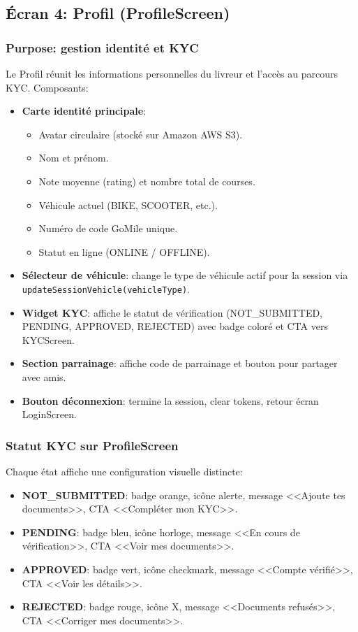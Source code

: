 \subsection{Écran 4: Profil (ProfileScreen)}

\subsubsection{Purpose: gestion identité et KYC}

Le Profil réunit les informations personnelles du livreur et l'accès au parcours KYC. Composants:

\begin{itemize}
    \item \textbf{Carte identité principale}:
    \begin{itemize}
        \item Avatar circulaire (stocké sur Amazon AWS S3).
        \item Nom et prénom.
        \item Note moyenne (rating) et nombre total de courses.
        \item Véhicule actuel (BIKE, SCOOTER, etc.).
        \item Numéro de code GoMile unique.
        \item Statut en ligne (ONLINE / OFFLINE).
    \end{itemize}
    \item \textbf{Sélecteur de véhicule}: change le type de véhicule actif pour la session via \texttt{updateSessionVehicle(vehicleType)}.
    \item \textbf{Widget KYC}: affiche le statut de vérification (NOT\_SUBMITTED, PENDING, APPROVED, REJECTED) avec badge coloré et CTA vers KYCScreen.
    \item \textbf{Section parrainage}: affiche code de parrainage et bouton pour partager avec amis.
    \item \textbf{Bouton déconnexion}: termine la session, clear tokens, retour écran LoginScreen.
\end{itemize}

\subsubsection{Statut KYC sur ProfileScreen}

Chaque état affiche une configuration visuelle distincte:

\begin{itemize}
    \item \textbf{NOT\_SUBMITTED}: badge orange, icône alerte, message <<Ajoute tes documents>>, CTA <<Compléter mon KYC>>.
    \item \textbf{PENDING}: badge bleu, icône horloge, message <<En cours de vérification>>, CTA <<Voir mes documents>>.
    \item \textbf{APPROVED}: badge vert, icône checkmark, message <<Compte vérifié>>, CTA <<Voir les détails>>.
    \item \textbf{REJECTED}: badge rouge, icône X, message <<Documents refusés>>, CTA <<Corriger mes documents>>.
\end{itemize}

